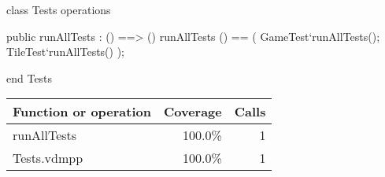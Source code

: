 \begin{vdm_al}
class Tests
 operations

 public runAllTests : () ==> ()
 runAllTests () == (
  GameTest`runAllTests();
  TileTest`runAllTests()
 );

end Tests
\end{vdm_al}
\bigskip
\begin{longtable}{|l|r|r|}
\hline
Function or operation & Coverage & Calls \\
\hline
\hline
runAllTests & 100.0\% & 1 \\
\hline
\hline
Tests.vdmpp & 100.0\% & 1 \\
\hline
\end{longtable}

